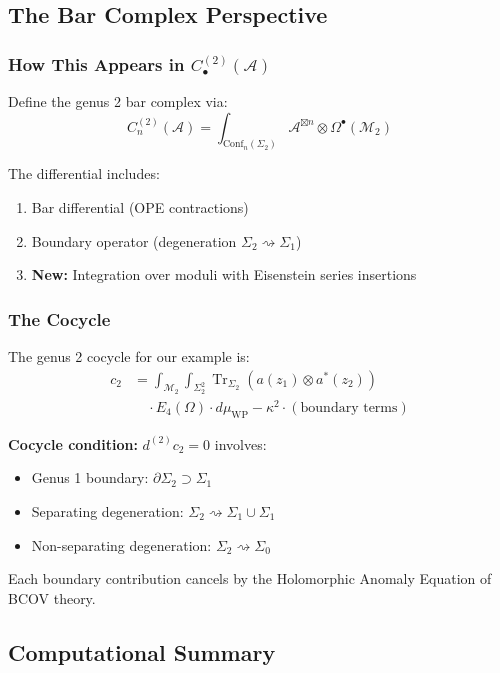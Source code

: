 \subsection{The Bar Complex Perspective}

\subsubsection{How This Appears in $C_{\bullet}^{(2)}(\mathcal{A})$}

Define the genus 2 bar complex via:
$$C_n^{(2)}(\mathcal{A}) = \int_{\mathrm{Conf}_n(\Sigma_2)} 
\mathcal{A}^{\boxtimes n} 
\otimes \Omega^{\bullet}(\mathcal{M}_2)$$

The differential includes:
\begin{enumerate}
\item Bar differential (OPE contractions)
\item Boundary operator (degeneration $\Sigma_2 \rightsquigarrow \Sigma_1$)
\item \textbf{New:} Integration over moduli with Eisenstein series insertions
\end{enumerate}

\subsubsection{The Cocycle}

The genus 2 cocycle for our example is:
\begin{align}
c_2 &= \int_{\mathcal{M}_2} \int_{\Sigma_2^2} 
\operatorname{Tr}_{\Sigma_2}(a(z_1) \otimes a^*(z_2)) \\
&\quad \cdot E_4(\Omega) \cdot d\mu_{\text{WP}}
- \kappa^2 \cdot (\text{boundary terms})
\end{align}

\textbf{Cocycle condition:} $d^{(2)} c_2 = 0$ involves:
\begin{itemize}
\item Genus 1 boundary: $\partial \Sigma_2 \supset \Sigma_1$
\item Separating degeneration: $\Sigma_2 \rightsquigarrow \Sigma_1 \cup \Sigma_1$
\item Non-separating degeneration: $\Sigma_2 \rightsquigarrow \Sigma_0$
\end{itemize}

Each boundary contribution cancels by the Holomorphic Anomaly Equation of BCOV theory.

\subsection{Computational Summary}

